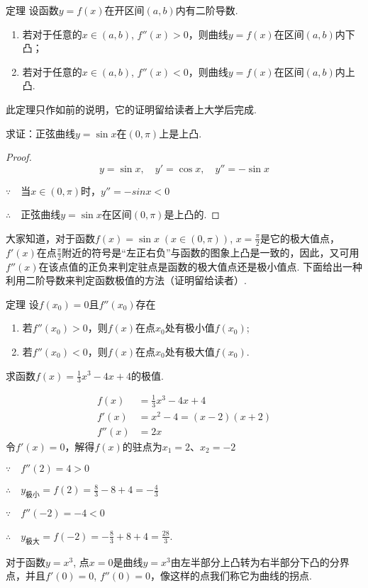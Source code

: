 \begin{thm}
{定理} 设函数$y=f(x)$在开区间$(a,b)$内有二阶导数.
\begin{enumerate}[(1)]
\item 若对于任意的$x\in (a,b)$, $f''(x)>0$，则曲线$y=f(x)$在区间$(a,b)$内下凸；
\item 若对于任意的$x\in (a,b)$, $f''(x)<0$，则曲线$y=f(x)$在区间$(a,b)$内上凸.  
\end{enumerate}
\end{thm}

此定理只作如前的说明，它的证明留给读者上大学后完成.

\begin{example}
    求证：正弦曲线$y=\sin x$在$(0,\pi)$上是上凸.
\end{example}

\begin{proof}
\[y=\sin x,\quad y'=\cos x,\quad y''=-\sin x\]

$\because\quad $当$x\in(0,\pi)$时，$y''=-sinx<0$

$\therefore\quad $正弦曲线$y=\sin x$在区间$(0,\pi)$是上凸的.
\end{proof}

大家知道，对于函数$f(x)=\sin x\; (x\in (0,\pi))$, $x=\frac{\pi}{2}$是它的极大值点，$f'(x)$在点$\frac{\pi}{2}$附近的符号是“左正右负”与函数的图象上凸是一致的，因此，又可用$f''(x)$在该点值的正负来判定驻点是函数的极大值点还是极小值点. 下面给出一种利用二阶导数来判定函数极值的方法（证明留给读者）.

\begin{thm}
    {定理} 设$f(x_0)=0$且$f''(x_0)$存在
\begin{enumerate}[(1)]
\item 若$f''(x_0)>0$，则$f(x)$在点$x_0$处有极小值$f(x_0)$;
\item 若$f''(x_0)<0$，则$f(x)$在点$x_0$处有极大值$f(x_0)$.
\end{enumerate}
\end{thm}


\begin{example}
    求函数$f(x)=\frac{1}{3}x^3-4x+4$的极值.
\end{example}

\begin{solution}
\[\begin{split}
    f(x)&=\frac{1}{3}x^3-4x+4\\
f'(x)&=x^2-4=(x-2)(x+2)\\
f''(x)&=2x
\end{split}\]
令$f'(x)=0$，解得$f(x)$的驻点为$x_1=2$、$x_2=-2$

$\because\quad f''(2)=4>0$

$\therefore\quad y_{\text{极小}}=f(2)=\frac{8}{3}-8+4=-\frac{4}{3}$

$\because\quad f''(-2)=-4<0$

$\therefore\quad y_{\text{极大}}=f(-2)=-\frac{8}{3}+8+4=\frac{28}{3}$.

对于函数$y=x^3$, 点$x=0$是曲线$y=x^3$由左半部分上凸转为右半部分下凸的分界点，并且$f'(0)=0$, $f''(0)=0$，像这样的点我们称它为曲线的拐点.
\end{solution}

